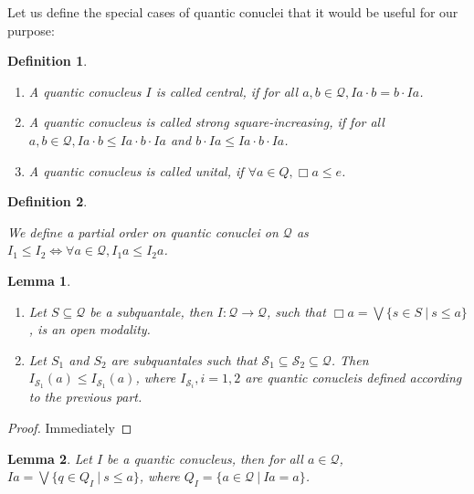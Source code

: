 \documentclass[a4paper]{article}
\theoremstyle{defin}
\newtheorem{defin}{Definition}
\theoremstyle{theorem}
\theoremstyle{prop}
\theoremstyle{lemma}
\newtheorem{lemma}{Lemma}
\theoremstyle{ex}
\theoremstyle{col}
\begin{document}
Let us define the special cases of quantic conuclei that it would be useful for our purpose:

\begin{defin}
$ $
\begin{enumerate}
  \item A quantic conucleus $I$ is called central, if for all
  $a, b \in \mathcal{Q}, I a \cdot b = b \cdot I a$.

  \item A quantic conucleus is called strong square-increasing,
  if for all $a, b \in \mathcal{Q}, I a \cdot b \leq I a \cdot b \cdot I a$ and
  $b \cdot I a \leq I a \cdot b \cdot I a$.

  \item A quantic conucleus is called unital, if $\forall a \in Q, \Box a \leq e$.
\end{enumerate}
\end{defin}

\begin{defin}
$ $

  We define a partial order on quantic conuclei on $\mathcal{Q}$ as
  $I_1 \leq I_2 \Leftrightarrow \forall a \in \mathcal{Q}, I_1 a \leq I_2 a$.
\end{defin}

\begin{lemma}
$ $

  \begin{enumerate}
    \item Let $S \subseteq \mathcal{Q}$ be a subquantale, then $I : \mathcal{Q} \to \mathcal{Q}$, such that $\Box a = \bigvee \{ s \in S \: | \: s \leq a \}$, is an open modality.
    \item Let $S_1$ and $S_2$ are subquantales such that $\mathcal{S}_1 \subseteq \mathcal{S}_2 \subseteq \mathcal{Q}$. Then $I_{\mathcal{S}_1} (a) \leq I_{\mathcal{S}_1} (a)$, where $I_{\mathcal{S}_i}, i = 1,2$ are quantic conucleis defined according to the previous part.
  \end{enumerate}
\end{lemma}

\begin{proof}
  Immediately
\end{proof}

\begin{lemma} Let $I$ be a quantic conucleus, then for all $a \in \mathcal{Q}$, $I a = \bigvee \{ q \in Q_{I} \: | \: s \leq a \}$, where $Q_{I} = \{ a \in \mathcal{Q} \: | \: I a = a \}$.
\end{lemma}
\end{document}

